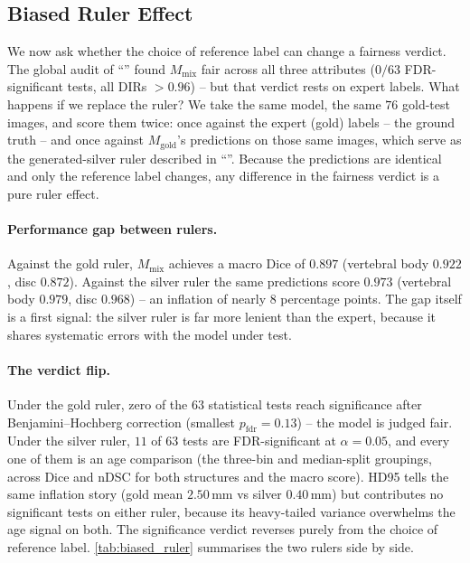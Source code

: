 \subsection{Biased Ruler Effect}
\label{sec:biased_ruler}

We now ask whether the choice of reference label can change a fairness verdict.
The global audit of ``'' found $M_{\mathrm{mix}}$ fair across
all three attributes ($0/63$ FDR-significant tests, all DIRs $> 0.96$) -- but that
verdict rests on expert labels. What happens if we replace the ruler?
We take the same model, the same $76$ gold-test images, and
score them twice: once against the expert (gold) labels -- the ground truth --
and once against $M_{\mathrm{gold}}$'s predictions on those same images, which
serve as the generated-silver ruler described in ``''.
Because the predictions are identical and only the reference label changes, any
difference in the fairness verdict is a pure ruler effect.

\paragraph{Performance gap between rulers.}
Against the gold ruler, $M_{\mathrm{mix}}$ achieves a macro Dice of $0.897$
(vertebral body $0.922$, disc $0.872$). Against the silver ruler the same
predictions score $0.973$ (vertebral body $0.979$, disc $0.968$) -- an inflation
of nearly $8$ percentage points. The gap itself is a first signal: the silver
ruler is far more lenient than the expert, because it shares systematic errors
with the model under test.

\paragraph{The verdict flip.}
Under the gold ruler, zero of the $63$ statistical tests reach significance after
Benjamini--Hochberg correction (smallest $p_{\mathrm{fdr}} = 0.13$) -- the model
is judged fair. Under the silver ruler, $11$ of $63$ tests are FDR-significant at
$\alpha = 0.05$, and every one of them is an age comparison (the three-bin and
median-split groupings, across Dice and nDSC for both structures and the macro
score). HD95 tells the same inflation story (gold mean $2.50$\,mm vs silver
$0.40$\,mm) but contributes no significant tests on either ruler, because its
heavy-tailed variance overwhelms the age signal on both.
The significance verdict reverses purely from the choice of reference
label. \autoref{tab:biased_ruler} summarises the two rulers side by side.

